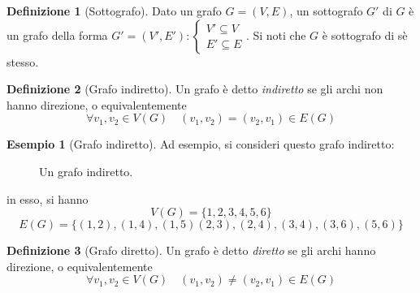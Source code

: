 \documentclass[14pt]{extreport}
\theoremstyle{definition}
\newtheorem{definition}{Definizione}[subsection]
\theoremstyle{definition}
\newtheorem{example}{Esempio}[subsection]
\begin{document}
\begin{definition}[Sottografo]
    Dato un grafo $G = (V, E)$, un sottografo $G'$ di $G$ è un grafo della forma $G' = (V', E'): \left \{ \begin{array}{l} V' \subseteq V \\ E' \subseteq E \end{array} \right.$. Si noti che $G$ è sottografo di sè stesso.
\end{definition}

\begin{definition}[Grafo indiretto]
    Un grafo è detto \textit{indiretto} se gli archi non hanno direzione, o equivalentemente $$\forall v_1, v_2 \in V(G) \quad (v_1, v_2) = (v_2, v_1) \in E(G)$$
\end{definition}

\begin{example}[Grafo indiretto]
    Ad esempio, si consideri questo grafo indiretto:

    \begin{figure}[H]
        \centering
        \caption{Un grafo indiretto.}
    \end{figure}

    in esso, si hanno $$V(G) = \{1, 2, 3, 4, 5, 6\}$$ $$E(G) = \{(1, 2), (1, 4), (1, 5) (2, 3), (2, 4), (3, 4), (3, 6), (5, 6)\}$$
\end{example}

\begin{definition}[Grafo diretto]
    Un grafo è detto \textit{diretto} se gli archi hanno direzione, o equivalentemente $$\forall v_1, v_2 \in V(G) \quad (v_1, v_2) \neq (v_2, v_1) \in E(G)$$
\end{definition}
\end{document}
